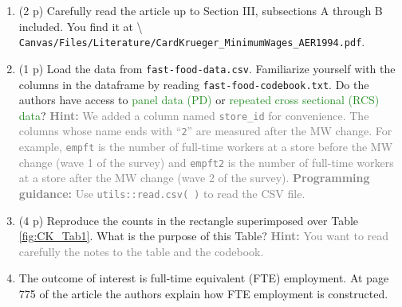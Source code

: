 \documentclass[
]{article}
\begin{document}
\begin{enumerate}
\def\labelenumi{\arabic{enumi}.}
\setcounter{enumi}{8}
\item
  (2 p) Carefully read the article up to Section III, subsections A
  through B included. You find it at \textbackslash{}
  \texttt{Canvas/Files/Literature/CardKrueger\_MinimumWages\_AER1994.pdf}.
\item
  (1 p) Load the data from \texttt{fast-food-data.csv}. Familiarize
  yourself with the columns in the dataframe by reading
  \texttt{fast-food-codebook.txt}. Do the authors have access to
  \textcolor{ForestGreen}{panel data (PD)} or
  \textcolor{ForestGreen}{repeated cross sectional (RCS) data}?
  \textcolor{gray}{\textbf{Hint:} We added a column named \texttt{store\_id} for convenience. The columns whose name ends with ``\texttt{2}'' are measured after the MW change. For example, \texttt{empft} is the number of full-time workers at a store before the MW change (wave 1 of the survey) and \texttt{empft2} is the number of full-time workers at a store after the MW change (wave 2 of the survey).}
  \textcolor{gray}{\textbf{Programming guidance:} Use \texttt{utils::read.csv( )} to read the CSV file.}
\item
  (4 p) Reproduce the counts in the rectangle superimposed over Table
  \ref{fig:CK_Tab1}. What is the purpose of this Table?
  \textcolor{gray}{\textbf{Hint:} You want to read carefully the notes to the table and the codebook.}
\item
  The outcome of interest is full-time equivalent (FTE) employment. At
  page 775 of the article the authors explain how FTE employment is
  constructed.


\end{enumerate}
\end{document}
